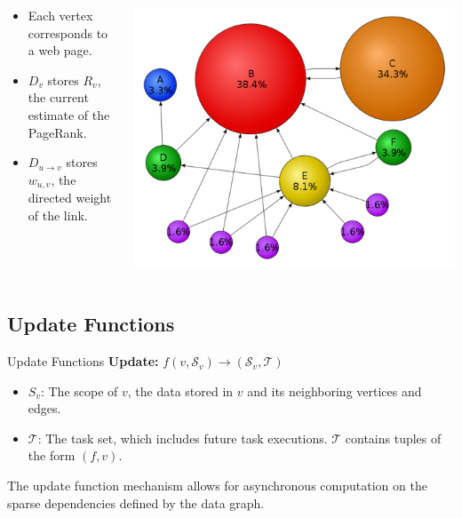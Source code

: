 \documentclass[onlymath,xcolor=pdftex,dvipsnames,table]{beamer}
\theoremstyle{remark} %
\begin{document}
\begin{frame}
\begin{columns}
  \begin{column}{0.5\textwidth}
    \begin{example}[PageRank]
      \begin{itemize}
        \item Each vertex corresponds to a web page.
        \item $D_v$ stores $R_v$, the current estimate of the PageRank.
        \item $D_{u\rightarrow v}$ stores $w_{u,v}$, the directed weight of the link.
      \end{itemize}
    \end{example}
  \end{column}
  \begin{column}{0.5\textwidth}
    \includegraphics[width=\columnwidth]{pagerank.pdf}
  \end{column}
\end{columns}
\end{frame}

\subsection{Update Functions}
\begin{frame}{Update Functions}
\textbf{Update:} $f(v,\mathcal{S}_v)\rightarrow (\mathcal{S}_v, \mathcal{T})$
\begin{itemize}
  \item $S_v$: The scope of $v$, the data stored in $v$ and its neighboring vertices and edges.
  \item $\mathcal{T}$: The task set, which includes future task executions. $\mathcal{T}$ contains tuples of the form $(f, v)$.
\end{itemize}
The update function mechanism allows for asynchronous computation on the sparse dependencies defined by the data graph.
\end{frame}
\end{document}
